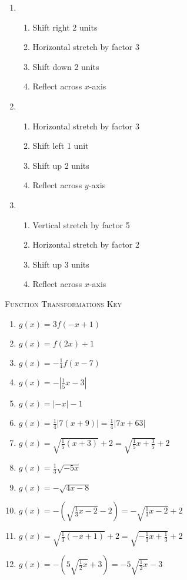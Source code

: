 \begin{enumerate}	\setcounter{enumi}{\value{Review}}
\item \begin{enumerate}[(1)]
\setlength\itemsep{0pt}
    \item Shift right 2 units
    \item Horizontal stretch by factor 3
    \item Shift down 2 units
    \item Reflect across $x$-axis
\end{enumerate}

\item
\begin{enumerate}[(1)]
\setlength\itemsep{0pt}
    \item Horizontal stretch by factor 3
    \item Shift left 1 unit
    \item Shift up 2 units
    \item Reflect across $y$-axis
\end{enumerate}

\item
\begin{enumerate}[(1)]
\setlength\itemsep{0pt}
    \item Vertical stretch by factor 5
    \item Horizontal stretch by factor 2
    \item Shift up 3 units
    \item Reflect across $x$-axis
\end{enumerate}
\setcounter{Review}{\value{enumi}}
\end{enumerate}

\newpage

\textsc{Function Transformations Key} 

\begin{enumerate}
	\item $g(x) = 3f(-x+1)$
	\item $g(x) = f(2x)+1$
	\item $g(x) = -\frac{1}{4}f(x-7)$
    \item $g(x) = -\left|\frac{1}{5}x-3\right|$
    \item $g(x) = |-x|-1$
    \item $g(x) = \frac{1}{4}|7(x+9)| = \frac{1}{4}|7x+63|$
    \item $g(x) = \sqrt{\frac{1}{5}(x+3)} + 2 = \sqrt{\frac{1}{5}x + \frac{3}{5}}+2$
    \item $g(x) = \frac{1}{3}\sqrt{-5x}$
    \item $g(x) = -\sqrt{4x-8}$
    \item $g(x) = -\left(\sqrt{\frac{1}{3}x-2}-2\right) = -\sqrt{\frac{1}{3}x-2}+2$
     \item $g(x) = \sqrt{\frac{1}{3}(-x+1)}+2 = \sqrt{-\frac{1}{3}x+\frac{1}{3}}+2$
     \item $g(x) = -\left(5\sqrt{\frac{1}{2}x}+3\right) = -5\sqrt{\frac{1}{2}x} - 3$
\end{enumerate}
